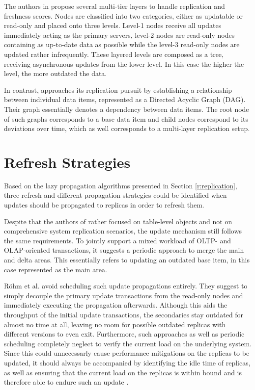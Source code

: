 The authors in \cite{voicu:2010} propose several multi-tier layers to handle replication and freshness scores. 
Nodes are classified into two categories, either as updatable or read-only and placed onto three levels.
Level-1 nodes receive all updates immediately acting as the primary servers, level-2 nodes are read-only nodes containing as up-to-date data as possible while the
level-3 read-only nodes are updated rather infrequently. These layered levels are composed as a tree, receiving asynchronous updates from the lower level. 
In this case the higher the level, the more outdated the data.

In contrast, \cite{xiang:2008} approaches its replication pursuit by establishing a relationship between individual data items, represented as a Directed Acyclic Graph (DAG).
Their graph essentially denotes a dependency between data items. The root node of such graphs corresponds to a base data item and child nodes correspond 
to its deviations over time, which as well corresponds to a multi-layer replication setup.





\section{Refresh Strategies}
\label{r:strategies}
Based on the lazy propagation algorithms presented in Section \ref{r:replication}, three refresh and different propagation strategies could be identified when updates should be propagated 
to replicas in order to refresh them.

Despite that the authors of \cite{psaroudakis:2015} rather focused on table-level objects and not on comprehensive system replication scenarios, the update mechanism 
still follows the same requirements. To jointly support a mixed workload of OLTP- and OLAP-oriented transactions,
it suggests a periodic approach to merge the main and delta areas. This essentially refers to updating an outdated base item, in this case represented as the main area.

Röhm et al. \cite{rohm:2002} avoid scheduling such update propagations entirely. They suggest to simply decouple the primary update transactions from the read-only nodes
and immediately executing the propagation afterwards. Although this aids the throughput of the initial update transactions, the secondaries 
stay outdated for almost no time at all, leaving no room for possible outdated replicas with different versions to even exit. 
Furthermore, such approaches as well as periodic scheduling completely neglect to verify the current load on the underlying system.
Since this could unnecessarly cause performance mitigations on the replicas to be updated, it should always be accompanied by identifying the idle time of replicas, as well 
as ensuring that the current load on the replicas is within bound and is therefore able to endure such an update \cite{voicu:2010}.


